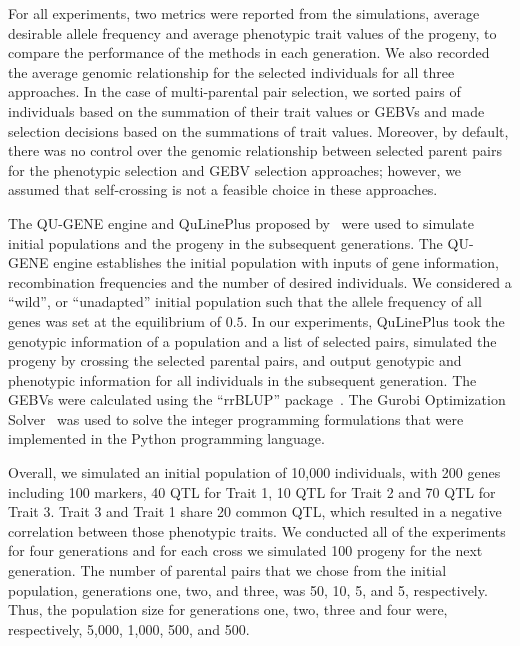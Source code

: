 \documentclass[12pt, a4paper, bibliography=totoc]{scrartcl}
\newcommand{\pouya}[1]{{\color{orange} #1}}
\begin{document}
For all experiments, two metrics were reported from the simulations, average desirable allele frequency and average phenotypic trait values of the progeny, to compare the performance of the methods in each generation. We also recorded the average genomic relationship for the selected individuals for all three approaches. In the case of multi-parental pair selection, we sorted pairs of individuals based on the summation of their trait values or GEBVs and made selection decisions based on the summations of trait values. Moreover, by default, there was no control over the genomic relationship between selected parent pairs for the phenotypic selection and GEBV selection approaches; however, we assumed that self-crossing is not a feasible choice in these approaches.



The QU-GENE engine and QuLinePlus proposed by~\cite{ali2020modeling} were used to simulate initial populations and the progeny in the subsequent generations. The QU-GENE engine establishes the initial population with inputs of gene information, recombination frequencies and the number of desired individuals. We considered a ``wild'', or ``unadapted'' initial population such that the allele frequency of all genes was set at the equilibrium of $0.5$. In our experiments,  QuLinePlus took the genotypic information of a population and a list of selected pairs, simulated the progeny by crossing the selected parental pairs, and output genotypic and phenotypic information for all individuals in the subsequent generation. The GEBVs were calculated using the ``rrBLUP'' package~\citep{endelman2011ridge}. The Gurobi Optimization Solver~\citep{gurobi} was used to solve the integer programming formulations that were implemented in the Python programming language.

Overall, we simulated an initial population of 10,000 individuals, with 200 genes including 100 markers, 40 QTL for Trait 1, 10 QTL for Trait 2 and 70 QTL for Trait 3. Trait 3 and Trait 1 share 20 common QTL, which resulted in a negative correlation between those phenotypic traits. We conducted all of the experiments for four generations and for each cross we simulated 100 progeny for the next generation. The number of parental pairs that we chose from the initial population, generations one, two, and three, was 50, 10, 5, and 5, respectively. Thus, the population size for generations one, two, three and four were, respectively, 5,000, 1,000, 500, and 500.
\end{document}
